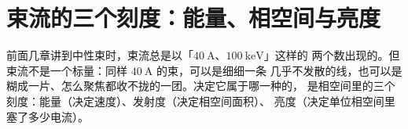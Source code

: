 \section{束流的三个刻度：能量、相空间与亮度}
\label{sec:app-ax-scales}

前面几章讲到中性束时，束流总是以「$40\ \mathrm{A}$、$100\ \mathrm{keV}$」这样的
两个数出现的。但束流不是一个标量：同样 $40\ \mathrm{A}$ 的束，可以是细细一条
几乎不发散的线，也可以是糊成一片、怎么聚焦都收不拢的一团。决定它属于哪一种的，
是相空间里的三个刻度：能量（决定速度）、发射度（决定相空间面积）、
亮度（决定单位相空间里塞了多少电流）。

